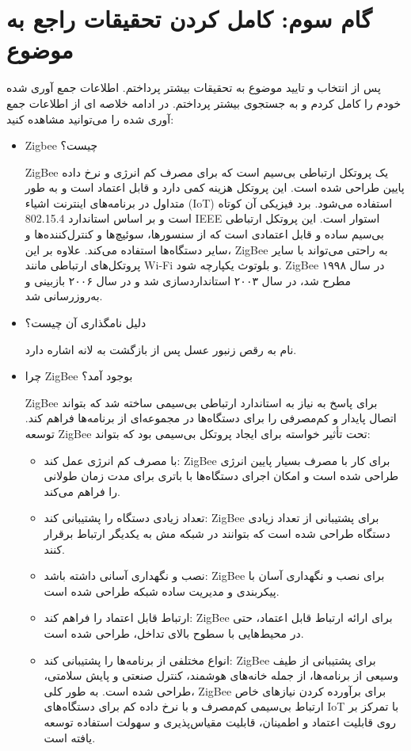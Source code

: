 \def \Subject {گام سوم: کامل کردن تحقیقات راجع به موضوع}
\section{\Subject}
پس از انتخاب و تایید موضوع به تحقیقات بیشتر پرداختم.
اطلاعات جمع آوری شده خودم را کامل کردم و به جستجوی بیشتر پرداختم.
در ادامه خلاصه ای از اطلاعات جمع آوری شده را می‌توانید مشاهده کنید:

\begin{itemize}
\item 
{
Zigbee
چیست؟ 

ZigBee یک پروتکل ارتباطی بی‌سیم است که برای مصرف کم انرژی و نرخ داده پایین طراحی شده است. این پروتکل هزینه کمی دارد و قابل اعتماد است و به طور متداول در برنامه‌های اینترنت اشیاء (IoT) استفاده می‌شود. برد فیزیکی آن کوتاه است و بر اساس استاندارد 
802.15.4 IEEE 
استوار است. این پروتکل ارتباطی بی‌سیم ساده و قابل اعتمادی است که از سنسورها، سوئیچ‌ها و کنترل‌کننده‌ها و سایر دستگاه‌ها استفاده می‌کند. علاوه بر این، ZigBee به راحتی می‌تواند با سایر پروتکل‌های ارتباطی مانند Wi-Fi و بلوتوث یکپارچه شود. ZigBee در سال ۱۹۹۸ مطرح شد، در سال ۲۰۰۳ استانداردسازی شد و در سال ۲۰۰۶ بازبینی و به‌روزرسانی شد.
}

\item  
{
دلیل نامگذاری آن چیست؟

نام به رقص زنبور عسل پس از بازگشت به لانه اشاره دارد.
}

\item 
{
چرا ZigBee بوجود آمد؟

ZigBee برای پاسخ به نیاز به استاندارد ارتباطی بی‌سیمی ساخته شد که بتواند اتصال پایدار و کم‌مصرفی را برای دستگاه‌ها در مجموعه‌ای از برنامه‌ها فراهم کند. توسعه ZigBee تحت تأثیر خواسته برای ایجاد پروتکل بی‌سیمی بود که بتواند:
    \begin{itemize}
        \item {
            با مصرف کم انرژی عمل کند: ZigBee برای کار با مصرف بسیار پایین انرژی طراحی شده است و امکان اجرای دستگاه‌ها با باتری برای مدت زمان طولانی را فراهم می‌کند.
        }
        \item {
            تعداد زیادی دستگاه را پشتیبانی کند: ZigBee برای پشتیبانی از تعداد زیادی دستگاه طراحی شده است که بتوانند در شبکه مش به یکدیگر ارتباط برقرار کنند.
        }
        \item {
            نصب و نگهداری آسانی داشته باشد: ZigBee برای نصب و نگهداری آسان با پیکربندی و مدیریت ساده شبکه طراحی شده است.
        }
        \item {
            ارتباط قابل اعتماد را فراهم کند: ZigBee برای ارائه ارتباط قابل اعتماد، حتی در محیط‌هایی با سطوح بالای تداخل، طراحی شده است.
        }
        \item {
            انواع مختلفی از برنامه‌ها را پشتیبانی کند: ZigBee برای پشتیبانی از طیف وسیعی از برنامه‌ها، از جمله خانه‌های هوشمند، کنترل صنعتی و پایش سلامتی، طراحی شده است.
            به طور کلی، ZigBee برای برآورده کردن نیازهای خاص ارتباط بی‌سیمی کم‌مصرف و با نرخ داده کم برای دستگاه‌های IoT با تمرکز بر روی قابلیت اعتماد و اطمینان، قابلیت مقیاس‌پذیری و 
            سهولت استفاده توسعه یافته است.
        }


\end{itemize}}
\end{itemize}
